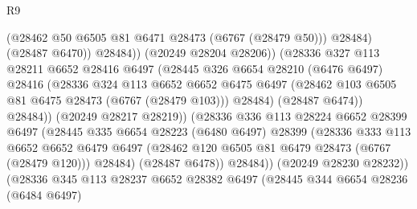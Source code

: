 \begin{lexlean}{R9}
\begin{coremodule}
                                      (@28462 @50 @6505 @81 @6471 @28473 (@6767 (@28479 @50)))
                                      @28484)
                                    (@28487 @6470))
                                  @28484))
                              (@20249 @28204 @28206))
                            (@28336
                              @327
                              @113
                              @28211
                              @6652
                              @28416
                              @6497
                              (@28445
                                @326
                                @6654
                                @28210
                                (@6476 @6497)
                                @28416
                                (@28336
                                  @324
                                  @113
                                  @6652
                                  @6652
                                  @6475
                                  @6497
                                  (@28462 @103 @6505 @81 @6475 @28473 (@6767 (@28479 @103)))
                                  @28484)
                                (@28487 @6474))
                              @28484))
                          (@20249 @28217 @28219))
                        (@28336
                          @336
                          @113
                          @28224
                          @6652
                          @28399
                          @6497
                          (@28445
                            @335
                            @6654
                            @28223
                            (@6480 @6497)
                            @28399
                            (@28336
                              @333
                              @113
                              @6652
                              @6652
                              @6479
                              @6497
                              (@28462 @120 @6505 @81 @6479 @28473 (@6767 (@28479 @120)))
                              @28484)
                            (@28487 @6478))
                          @28484))
                      (@20249 @28230 @28232))
                    (@28336
                      @345
                      @113
                      @28237
                      @6652
                      @28382
                      @6497
                      (@28445
                        @344
                        @6654
                        @28236
                        (@6484 @6497)

\end{coremodule}
\end{lexlean}
